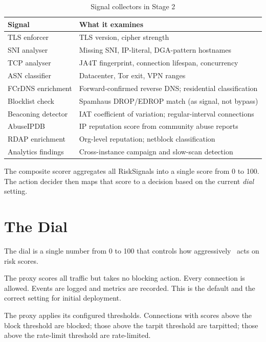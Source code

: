 \begin{table}[ht]
  \small
  \begin{tabularx}{\linewidth}{lX}
    \toprule
    \textbf{Signal} & \textbf{What it examines} \\
    \midrule
    TLS enforcer & TLS version, cipher strength \\
    SNI analyser & Missing SNI, IP-literal, DGA-pattern hostnames \\
    TCP analyser & JA4T fingerprint, connection lifespan, concurrency \\
    ASN classifier & Datacenter, Tor exit, VPN ranges \\
    FCrDNS enrichment & Forward-confirmed reverse DNS; residential classification \\
    Blocklist check & Spamhaus DROP/EDROP match (as signal, not bypass) \\
    Beaconing detector & IAT coefficient of variation; regular-interval connections \\
    AbuseIPDB & IP reputation score from community abuse reports \\
    RDAP enrichment & Org-level reputation; netblock classification \\
    Analytics findings & Cross-instance campaign and slow-scan detection \\
    \bottomrule
  \end{tabularx}
  \caption{Signal collectors in Stage 2}
\end{table}

The composite scorer aggregates all RiskSignals into a single score from 0 to 100.
The action decider then maps that score to a decision based on the current \emph{dial} setting.

\section{The Dial}

The dial is a single number from 0 to 100 that controls how aggressively \ja\ acts
on risk scores.

\begin{description}[leftmargin=2.5cm]
  \item[\dialzero] The proxy scores all traffic but takes no blocking action.
    Every connection is allowed. Events are logged and metrics are recorded.
    This is the default and the correct setting for initial deployment.
  \item[\dialhundred] The proxy applies its configured thresholds. Connections
    with scores above the block threshold are blocked; those above the tarpit
    threshold are tarpitted; those above the rate-limit threshold are rate-limited.
\end{description}

